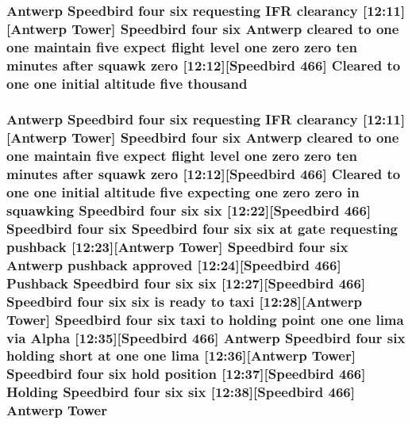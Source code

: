 \subsubsection[{\texorpdfstring{thousand}{thousand}}]{\setlength{\rightskip}{0pt plus 5cm}Antwerp Speedbird four {\bf six} requesting I\+FR clearancy \mbox{[}12\+:11\mbox{]}\mbox{[}Antwerp {\bf Tower}\mbox{]} Speedbird four {\bf six} Antwerp cleared to {\bf one} {\bf one} maintain five expect flight level {\bf one} {\bf zero} {\bf zero} {\bf ten} minutes after squawk {\bf zero} \mbox{[}12\+:12\mbox{]}\mbox{[}Speedbird 466\mbox{]} Cleared to {\bf one} {\bf one} initial altitude five thousand}\hypertarget{happyDay5ATC_8txt_a429913a0643fe14faca3dca538caa7bb}{}\label{happyDay5ATC_8txt_a429913a0643fe14faca3dca538caa7bb}
\subsubsection[{\texorpdfstring{Tower}{Tower}}]{\setlength{\rightskip}{0pt plus 5cm}Antwerp Speedbird four {\bf six} requesting I\+FR clearancy \mbox{[}12\+:11\mbox{]}\mbox{[}Antwerp Tower\mbox{]} Speedbird four {\bf six} Antwerp cleared to {\bf one} {\bf one} maintain five expect flight level {\bf one} {\bf zero} {\bf zero} {\bf ten} minutes after squawk {\bf zero} \mbox{[}12\+:12\mbox{]}\mbox{[}Speedbird 466\mbox{]} Cleared to {\bf one} {\bf one} initial altitude five expecting {\bf one} {\bf zero} {\bf zero} in {\bf squawking} Speedbird four {\bf six} {\bf six} \mbox{[}12\+:22\mbox{]}\mbox{[}Speedbird 466\mbox{]} Speedbird four {\bf six} Speedbird four {\bf six} {\bf six} at gate requesting pushback \mbox{[}12\+:23\mbox{]}\mbox{[}Antwerp Tower\mbox{]} Speedbird four {\bf six} Antwerp pushback {\bf approved} \mbox{[}12\+:24\mbox{]}\mbox{[}Speedbird 466\mbox{]} Pushback Speedbird four {\bf six} {\bf six} \mbox{[}12\+:27\mbox{]}\mbox{[}Speedbird 466\mbox{]} Speedbird four {\bf six} {\bf six} is ready to taxi \mbox{[}12\+:28\mbox{]}\mbox{[}Antwerp Tower\mbox{]} Speedbird four {\bf six} taxi to holding point {\bf one} {\bf one} {\bf lima} via {\bf Alpha} \mbox{[}12\+:35\mbox{]}\mbox{[}Speedbird 466\mbox{]} Antwerp Speedbird four {\bf six} holding short at {\bf one} {\bf one} {\bf lima} \mbox{[}12\+:36\mbox{]}\mbox{[}Antwerp Tower\mbox{]} Speedbird four {\bf six} hold {\bf position} \mbox{[}12\+:37\mbox{]}\mbox{[}Speedbird 466\mbox{]} Holding Speedbird four {\bf six} {\bf six} \mbox{[}12\+:38\mbox{]}\mbox{[}Speedbird 466\mbox{]} Antwerp Tower}\hypertarget{happyDay5ATC_8txt_aa713126cf5a2ea490c73c69abd6e8b2e}{}\label{happyDay5ATC_8txt_aa713126cf5a2ea490c73c69abd6e8b2e}

